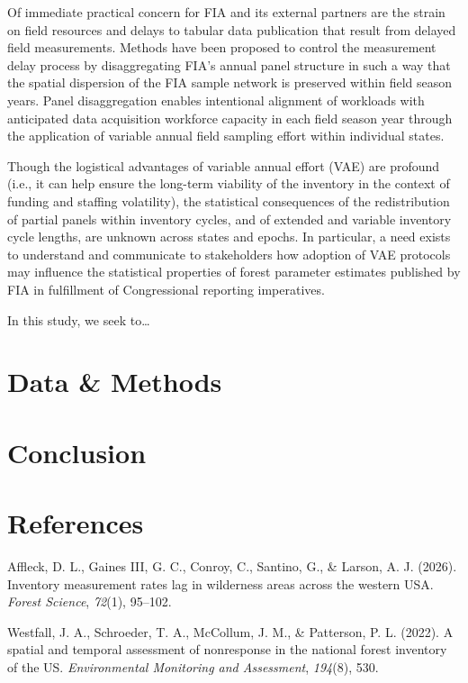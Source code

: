 \documentclass[
]{agujournal2019}
\newlength{\cslhangindent}
\newenvironment{CSLReferences}[2] %
 {\begin{list}{}{%
  \setlength{\itemindent}{0pt}
  \setlength{\leftmargin}{0pt}
  \setlength{\parsep}{0pt}
  \ifodd #1
   \setlength{\leftmargin}{\cslhangindent}
   \setlength{\itemindent}{-1\cslhangindent}
  \fi
  \setlength{\itemsep}{#2\baselineskip}}}
 {\end{list}}
\begin{document}
Of immediate practical concern for FIA and its external partners are the
strain on field resources and delays to tabular data publication that
result from delayed field measurements. Methods have been proposed to
control the measurement delay process by disaggregating FIA's annual
panel structure in such a way that the spatial dispersion of the FIA
sample network is preserved within field season years. Panel
disaggregation enables intentional alignment of workloads with
anticipated data acquisition workforce capacity in each field season
year through the application of variable annual field sampling effort
within individual states.

Though the logistical advantages of variable annual effort (VAE) are
profound (i.e., it can help ensure the long-term viability of the
inventory in the context of funding and staffing volatility), the
statistical consequences of the redistribution of partial panels within
inventory cycles, and of extended and variable inventory cycle lengths,
are unknown across states and epochs. In particular, a need exists to
understand and communicate to stakeholders how adoption of VAE protocols
may influence the statistical properties of forest parameter estimates
published by FIA in fulfillment of Congressional reporting imperatives.

In this study, we seek to\ldots{}

\section{Data \& Methods}\label{sec-data-methods}

\section{Conclusion}\label{conclusion}

\section*{References}\label{references}

\protect{}\label{refs}
\begin{CSLReferences}{1}{0}
\vspace{1em}

Affleck, D. L., Gaines III, G. C., Conroy, C., Santino, G., \& Larson,
A. J. (2026). Inventory measurement rates lag in wilderness areas across
the western USA. \emph{Forest Science}, \emph{72}(1), 95--102.

Westfall, J. A., Schroeder, T. A., McCollum, J. M., \& Patterson, P. L.
(2022). A spatial and temporal assessment of nonresponse in the national
forest inventory of the US. \emph{Environmental Monitoring and
Assessment}, \emph{194}(8), 530.

\end{CSLReferences}
\end{document}
